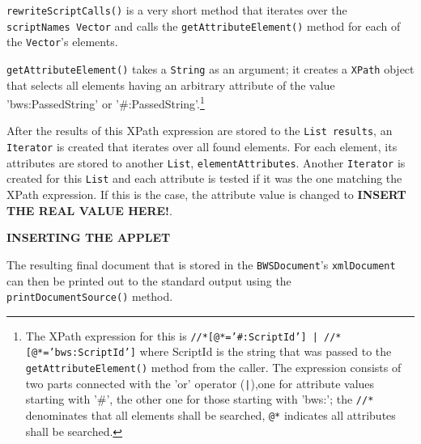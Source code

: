 \texttt{rewriteScriptCalls()} is a very short method that iterates over the \texttt{scriptNames Vector} and calls the \texttt{getAttributeElement()} method for each of the \texttt{Vector}'s elements.

\texttt{getAttributeElement()}
 takes a 
 \texttt{String}
  as an argument; it creates a 
  \texttt{XPath} object that selects all elements having an arbitrary attribute of the value 'bws:PassedString' or '\#:PassedString'.\footnote{
  The XPath expression for this is \texttt{//*[@*='\#:ScriptId'] | //*[@*='bws:ScriptId']} where ScriptId is the string that was passed to the \texttt{getAttributeElement()} method from the caller. The expression consists of two parts connected with the 'or' operator  (\texttt{|}),one for attribute values starting with '\#', the other one for those starting with 'bws:'; the \texttt{//*} denominates that all elements shall be searched, \texttt{@*} indicates all attributes shall be searched.
  }

After the results of this XPath expression are stored to the \texttt{List results}, an \texttt{Iterator} is created that iterates over all found elements. For each element, its attributes are stored to another \texttt{List}, \texttt{elementAttributes}. Another \texttt{Iterator} is created for this \texttt{List} and each attribute is tested if it was the one matching the XPath expression. If this is the case, the attribute value is changed to \textbf{INSERT THE REAL VALUE HERE!}.

\textbf{INSERTING THE APPLET}

The resulting final document that is stored in the \texttt{BWSDocument}'s \texttt{xmlDocument} can then be printed out to the standard output using the \texttt{printDocumentSource()} method.